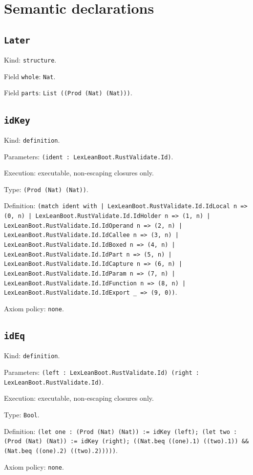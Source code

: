 \documentclass[11pt]{article}
\begin{document}
\section*{Semantic declarations}
\subsection*{\texttt{Later}}
\noindent Kind: \texttt{structure}.\par
\noindent Field \texttt{whole}: \texttt{Nat}.\par
\noindent Field \texttt{parts}: \texttt{List ((Prod (Nat) (Nat)))}.\par
\subsection*{\texttt{idKey}}
\noindent Kind: \texttt{definition}.\par
\noindent Parameters: \texttt{(ident : LexLeanBoot.RustValidate.Id)}.\par
\noindent Execution: executable, non-escaping closures only.\par
\noindent Type: \texttt{(Prod (Nat) (Nat))}.\par
\noindent Definition: \texttt{(match ident with | LexLeanBoot.RustValidate.Id.IdLocal n => (0, n) | LexLeanBoot.RustValidate.Id.IdHolder n => (1, n) | LexLeanBoot.RustValidate.Id.IdOperand n => (2, n) | LexLeanBoot.RustValidate.Id.IdCallee n => (3, n) | LexLeanBoot.RustValidate.Id.IdBoxed n => (4, n) | LexLeanBoot.RustValidate.Id.IdPart n => (5, n) | LexLeanBoot.RustValidate.Id.IdCapture n => (6, n) | LexLeanBoot.RustValidate.Id.IdParam n => (7, n) | LexLeanBoot.RustValidate.Id.IdFunction n => (8, n) | LexLeanBoot.RustValidate.Id.IdExport \_ => (9, 0))}.\par
\noindent Axiom policy: \texttt{none}.\par
\subsection*{\texttt{idEq}}
\noindent Kind: \texttt{definition}.\par
\noindent Parameters: \texttt{(left : LexLeanBoot.RustValidate.Id) (right : LexLeanBoot.RustValidate.Id)}.\par
\noindent Execution: executable, non-escaping closures only.\par
\noindent Type: \texttt{Bool}.\par
\noindent Definition: \texttt{(let one : (Prod (Nat) (Nat)) := idKey (left); (let two : (Prod (Nat) (Nat)) := idKey (right); ((Nat.beq ((one).1) ((two).1)) \&\& (Nat.beq ((one).2) ((two).2)))))}.\par
\noindent Axiom policy: \texttt{none}.\par
\end{document}
